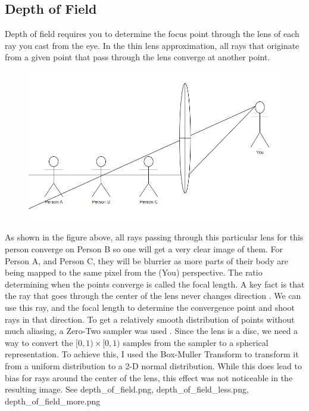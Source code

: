 \documentclass {article}
\begin{document}
\subsection{Depth of Field}
Depth of field requires you to determine the focus point through the lens of each ray you cast
from the eye. In the thin lens approximation, \cite{PBR} all rays that originate from a given point
that pass through the lens converge at another point.
\begin{center}
    \begin{figure}[H]
        \includegraphics[width=16cm]{diagram.png}
    \end{figure}
\end{center}
As shown in the figure above, all rays passing through this particular lens
for this person converge on Person B so one will get a very clear image of them.
For Person A, and Person C, they will be blurrier as more parts of their body are being
mapped to the same pixel from the (You) perspective.
The ratio determining when the points converge is called the focal length. A key fact
is that the ray that goes through the center of the lens never changes direction \cite{PBR}.
We can use this ray, and the focal length to determine the convergence point and shoot rays
in that direction. To 
get a relatively smooth distribution of points without much aliasing, a Zero-Two sampler was used \cite{PBR}.
Since the lens is a disc, we need a way to convert the $[0, 1)\times[0,1)$ samples from the sampler
to a spherical representation. To achieve this, I used the Box-Muller Transform \cite{weisstein_2020} to
transform it from a uniform distribution to a 2-D normal distribution. While this does lead to bias
for rays around the center of the lens, this effect was not noticeable in the resulting image.
See depth\_of\_field.png, depth\_of\_field\_less.png, depth\_of\_field\_more.png
\end{document}

